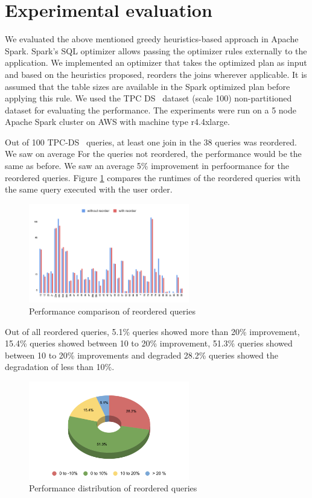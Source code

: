 \section{Experimental evaluation}\label{sec:exp-evaluation}
We evaluated the above mentioned greedy heuristics-based approach in Apache Spark. Spark's SQL optimizer allows passing the optimizer rules externally to the application. We implemented an optimizer that takes the optimized plan as input and based on the heuristics proposed, reorders the joins wherever applicable. It is assumed that the table sizes are available in the Spark optimized plan before applying this rule. We used the TPC DS~\cite{b14}  dataset (scale 100) non-partitioned dataset for evaluating the performance. The experiments were run on a 5 node Apache Spark cluster on AWS with machine type r4.4xlarge.

Out of 100 TPC-DS~\cite{b14}  queries, at least one join in the 38 queries was reordered. We saw on average  For the queries not reordered, the performance would be the same as before. We saw an average 5\% improvement in perfoormance for the reordered queries. Figure \ref{performance_number} compares the runtimes of the reordered queries with the same query executed with the user order.

\begin{figure}[ht]
    \centerline{\includegraphics[width=7cm]{fig/chart.png}}
    \caption{Performance comparison of reordered queries}
    \label{performance_number}
\end{figure}

Out of all reordered queries, 5.1\% queries showed more than 20\% improvement, 15.4\% queries showed between 10 to 20\% improvement, 51.3\% queries showed between 10 to 20\% improvements and degraded 28.2\% queries showed the degradation of less than 10\%.

\begin{figure}[ht]
\centerline{\includegraphics[width=7cm]{fig/pie.png}}
\caption{Performance distribution of reordered queries}
\label{performance_pie_chart}
\end{figure}

